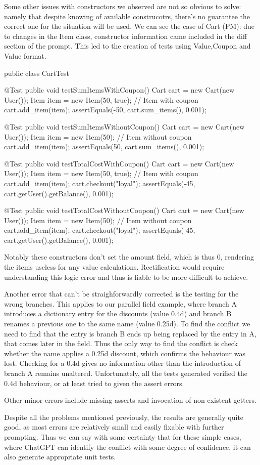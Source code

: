 Some other issues with constructors we observed are not so obvious to solve: namely that despite knowing of available construcotrs, there's no guarantee
the correct one for the situation will be used. We can see the case of Cart (PM): due to changes in the Item class, constructor information came included
in the diff section of the prompt. This led to the creation of tests using Value,Coupon and Value format.
\begin{answer}
    public class CartTest {

    @Test
    public void testSumItemsWithCoupon() {
        Cart cart = new Cart(new User());
        Item item = new Item(50, true); // Item with coupon
        cart.add_item(item);
        assertEquals(-50, cart.sum_items(), 0.001);
    }

    @Test
    public void testSumItemsWithoutCoupon() {
        Cart cart = new Cart(new User());
        Item item = new Item(50); // Item without coupon
        cart.add_item(item);
        assertEquals(50, cart.sum_items(), 0.001);
    }

    @Test
    public void testTotalCostWithCoupon() {
        Cart cart = new Cart(new User());
        Item item = new Item(50, true); // Item with coupon
        cart.add_item(item);
        cart.checkout("loyal");
        assertEquals(-45, cart.getUser().getBalance(), 0.001);
    }

    @Test
    public void testTotalCostWithoutCoupon() {
        Cart cart = new Cart(new User());
        Item item = new Item(50); // Item without coupon
        cart.add_item(item);
        cart.checkout("loyal");
        assertEquals(-45, cart.getUser().getBalance(), 0.001);
    }
}
\end{answer}
Notably these constructors don't set the amount field, which is thus 0, rendering the items useless for any value calculations.
Rectification would require understanding this logic error and thus is liable to be more difficult to achieve.

Another error that can't be straighforwardly corrected is the testing for the wrong branches. This applies
to our parallel field example, where branch A introduces a dictionary entry for the discounts (value 0.4d) and branch B renames a previous one to the same name (value 0.25d). To find the conflict
we need to find that the entry is branch B ends up being replaced by the entry in A, that comes later in the field. Thus the only way to find the conflict is check whether the name
applies a 0.25d discount, which confirms the behaviour was lost. Checking for a 0.4d gives no information other than the introduction of branch A remains unaltered.
Unfortunately, all the tests generated verified the 0.4d behaviour, or at least tried to given the assert errors.

Other minor errors include missing asserts and invocation of non-existent getters.

Despite all the problems mentioned previously, the results are generally quite good, as most errors are relatively small and easily fixable with further prompting. Thus we
can say with some certainty that for these simple cases, where ChatGPT can identify the conflict with some degree of confidence, it can also generate appropriate unit tests.
